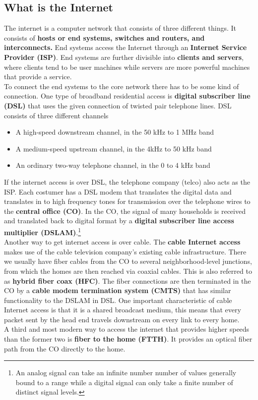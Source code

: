 \subsection{What is the Internet}
The internet is a computer network that consists of three different things. It consists of \textbf{hosts or end systems, switches and routers, and interconnects.} End systems access the Internet through an \textbf{Internet Service Provider (ISP)}. End systems are further divisible into \textbf{clients and servers}, where clients tend to be user machines while servers are more powerful machines that provide a service.\\
To connect the end systems to the core network there has to be some kind of connection. One type of broadband residential access is \textbf{digital subscriber line (DSL)} that uses the given connection of twisted pair telephone lines. DSL consists of three different channels
\begin{itemize}
\item A high-speed downstream channel, in the 50 kHz to 1 MHz band
\item A medium-speed upstream channel, in the 4kHz to 50 kHz band
\item An ordinary two-way telephone channel, in the 0 to 4 kHz band
\end{itemize}
If the internet access is over DSL, the telephone company (telco) also acts as the ISP. Each costumer has a DSL modem that translates the digital data and translates in to high frequency tones for transmission over the telephone wires to the \textbf{central office (CO)}. In the CO, the signal of many households is received and translated back to digital format by a \textbf{digital subscriber line access multiplier (DSLAM)}.\footnote{An analog signal can take an infinite number number of values generally bound to a range while a digital signal can only take a finite number of distinct signal levels.} \\
Another way to get internet access is over cable. The \textbf{cable Internet access} makes use of the cable television company's existing cable infrastructure. There we usually have fiber cables from the CO to several neighborhood-level junctions, from which the homes are then reached via coaxial cables. This is also referred to as \textbf{hybrid fiber coax (HFC)}. The fiber connections are then terminated in the CO by a \textbf{cable modem termination system (CMTS)}  that has similar functionality to the DSLAM in DSL. One important characteristic of cable Internet access is that it is a shared broadcast medium, this means that every packet sent by the head end travels downstream on every link to every home.\\
A third and most modern way to access the internet that provides higher speeds than the former two is \textbf{fiber to the home (FTTH)}. It provides an optical fiber path from the CO directly to the home. 

